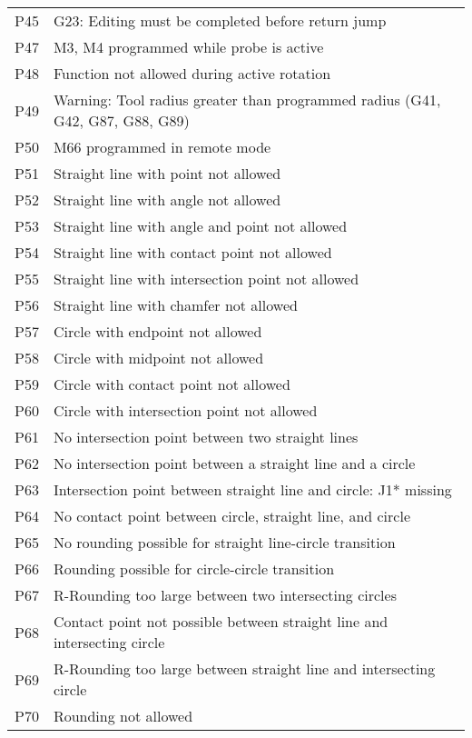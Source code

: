 \documentclass[openany,11pt]{book}
\begin{document}
\newpage
\begin{table}[!h]
    \begin{tabular}{ll}
    P45 & G23: Editing must be completed before return jump \\
    P47 & M3, M4 programmed while probe is active \\
    P48 & Function not allowed during active rotation \\
    P49 & Warning: Tool radius greater than programmed radius (G41, G42, G87, G88, G89) \\
    P50 & M66 programmed in remote mode \\
    P51 & Straight line with point not allowed \\
    P52 & Straight line with angle not allowed \\
    P53 & Straight line with angle and point not allowed \\
    P54 & Straight line with contact point not allowed \\
    P55 & Straight line with intersection point not allowed \\
    P56 & Straight line with chamfer not allowed \\
    P57 & Circle with endpoint not allowed \\
    P58 & Circle with midpoint not allowed \\
    P59 & Circle with contact point not allowed \\
    P60 & Circle with intersection point not allowed \\
    P61 & No intersection point between two straight lines \\
    P62 & No intersection point between a straight line and a circle \\
    P63 & Intersection point between straight line and circle: J1* missing \\
    P64 & No contact point between circle, straight line, and circle \\
    P65 & No rounding possible for straight line-circle transition \\
    P66 & Rounding possible for circle-circle transition \\
    P67 & R-Rounding too large between two intersecting circles \\
    P68 & Contact point not possible between straight line and intersecting circle \\
    P69 & R-Rounding too large between straight line and intersecting circle \\
    P70 & Rounding not allowed \\

\end{tabular}
\end{table}
\end{document}
